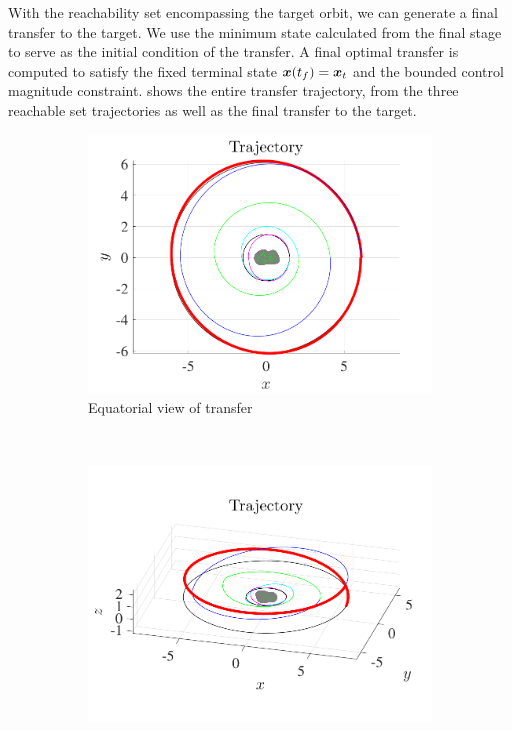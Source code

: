 \documentclass[]{aiaa-tc}%
\begin{document}
With the reachability set encompassing the target orbit, we can generate a final transfer to the target.
We use the minimum state calculated from the final stage to serve as the initial condition of the transfer.
A final optimal transfer is computed to satisfy the fixed terminal state \( \bm{x}(t_f) = \bm{x}_t \) and the bounded control magnitude constraint.
 shows the entire transfer trajectory, from the three reachable set trajectories as well as the final transfer to the target.
\begin{figure}[htbp] 
    \centering 
    \begin{subfigure}[htbp]{0.5\textwidth} 
        \includegraphics[width=\textwidth]{figures/trajectory.pdf} 
        \caption{Equatorial view of transfer} \label{fig:trajectory_up} 
    \end{subfigure}~ %
    \begin{subfigure}[htbp]{0.5\textwidth} 
        \includegraphics[width=\textwidth]{figures/trajectory_3d.pdf} 

\end{subfigure}
\end{figure}
\end{document}
